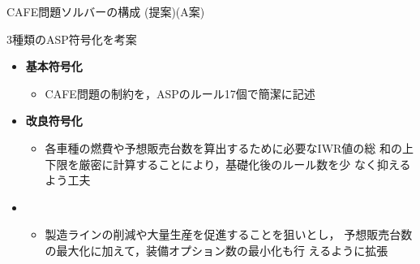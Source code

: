 \documentclass[dvipdfmx, 11pt]{beamer}
\begin{document}
 \begin{frame}{CAFE問題ソルバーの構成 (提案)\alert{(A案)}}
   \scalebox{0.9}{\centering}
   \begin{block}{3種類のASP符号化を考案}
     \begin{itemize}
     \item \alert{\bf 基本符号化}
       \begin{itemize}\footnotesize
       \item CAFE問題の制約を，ASPのルール17個で簡潔に記述
       \end{itemize}
     \item \alert{\bf 改良符号化}
       \begin{itemize}\footnotesize
       \item 各車種の燃費や予想販売台数を算出するために必要なIWR値の総
         和の上下限を厳密に計算することにより，基礎化後のルール数を少
         なく抑えるよう工夫
       \end{itemize}
     \item {}
       \begin{itemize}\footnotesize
         \item 製造ラインの削減や大量生産を促進することを狙いとし，
           予想販売台数の最大化に加えて，装備オプション数の最小化も行
           えるように拡張
       \end{itemize}
     \end{itemize}
   \end{block}
 \end{frame}
\end{document}
